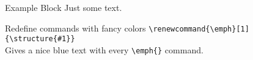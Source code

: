 \begin{frame}[plain]
\end{frame}

\begin{fragileframe}
        \begin{exampleblock}{Example Block}
                Just some text.
        \end{exampleblock}
        \begin{block}{Redefine commands with fancy colors}
                \verb+\renewcommand{\emph}[1]{\structure{#1}}+ \\
                Gives a nice blue text with every \verb+\emph{}+ command.
        \end{block}
\end{fragileframe}



